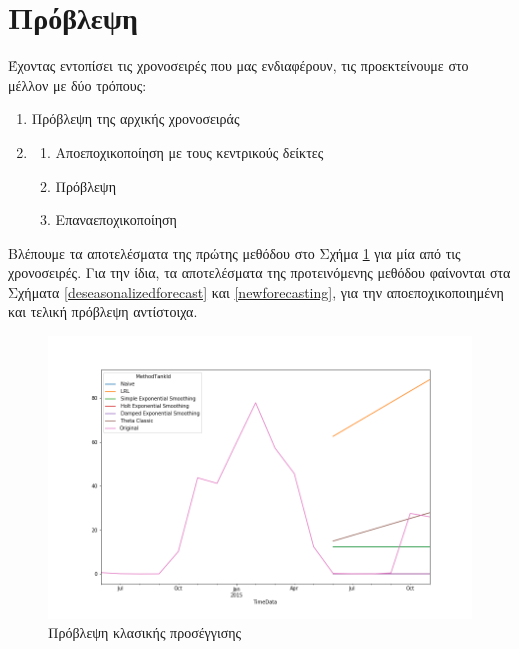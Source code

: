 \section{Πρόβλεψη}

Έχοντας εντοπίσει τις χρονοσειρές που μας ενδιαφέρουν, τις προεκτείνουμε στο μέλλον με δύο τρόπους:

\begin{enumerate}
    \item Πρόβλεψη της αρχικής χρονοσειράς
    \item \begin{enumerate}
	\item Αποεποχικοποίηση με τους κεντρικούς δείκτες
	\item Πρόβλεψη
	\item Επαναεποχικοποίηση
      \end{enumerate}
      \end{enumerate}
 
Βλέπουμε τα αποτελέσματα της πρώτης μεθόδου στο Σχήμα \ref{classicforecasting} για μία από τις χρονοσειρές. Για την ίδια, τα αποτελέσματα της προτεινόμενης μεθόδου φαίνονται στα Σχήματα \ref{deseasonalizedforecast} και \ref{newforecasting}, για την αποεποχικοποιημένη και τελική πρόβλεψη αντίστοιχα.


\begin{figure}[t!]
  \includegraphics[scale=0.5]{figures/classicforecasting.png}
\centering
\caption{Πρόβλεψη κλασικής προσέγγισης}
\label{classicforecasting}
\end{figure} 


